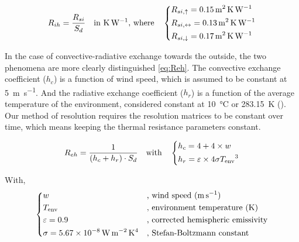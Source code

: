 \documentclass[11pt]{article}
\begin{document}
            \begin{equation}\label{eq:Rih_horiz}
                R_{ih} = \frac{R_{si}}{S_d} \quad \text{in \SI{}{\kelvin\per\watt}, where}\quad
                \begin{dcases}
                    R_{si,\uparrow} = \SI{0.15}{\square\meter\kelvin\per\watt}\\
                    R_{si,\leftrightarrow} = \SI{0.13}{\square\meter\kelvin\per\watt}\\
                    R_{si,\downarrow} = \SI{0.17}{\square\meter\kelvin\per\watt}
                \end{dcases}
            \end{equation}

            In the case of convective-radiative exchange towards the outside, the two phenomena are more clearly distinguished \eqref{eq:Reh}. The convective exchange coefficient ($h_c$) is a function of wind speed, which is assumed to be constant at \SI{5}{\meter\per\second}. And the radiative exchange coefficient ($h_r$) is a function of the average temperature of the environment, considered constant at \SI{10}{\celsius} or \SI{283.15}{\kelvin} (\cite{ministere_de_la_transition_ecologique_regles_2017-2}). Our method of resolution requires the resolution matrices to be constant over time, which means keeping the thermal resistance parameters constant. 
            
            \begin{equation}\label{eq:Reh}
                R_{eh} = \frac{1}{\left(h_c+h_r\right)\cdot S_d}\quad\text{with}\quad
                \begin{dcases}
                    h_c = 4 + 4\times w\\ 
                    h_r = \varepsilon \times 4\sigma {T_{\mathrm{env}}}^3
                \end{dcases}
            \end{equation}

            \noindent
            With,
            $$
            \begin{dcases}
                w &\text{, wind speed (\SI{}{\meter\per\second})}\\ 
                T_{\mathrm{env}} &\text{, environment temperature (\SI{}{\kelvin})}\\ 
                \varepsilon = 0.9 &\text{, corrected hemispheric emissivity}\\  
                \sigma = \SI{5.67e-8}{\watt\per\square\meter\kelvin\tothe{4}} &\text{, Stefan-Boltzmann constant}\\  
            \end{dcases}
            $$
\end{document}
